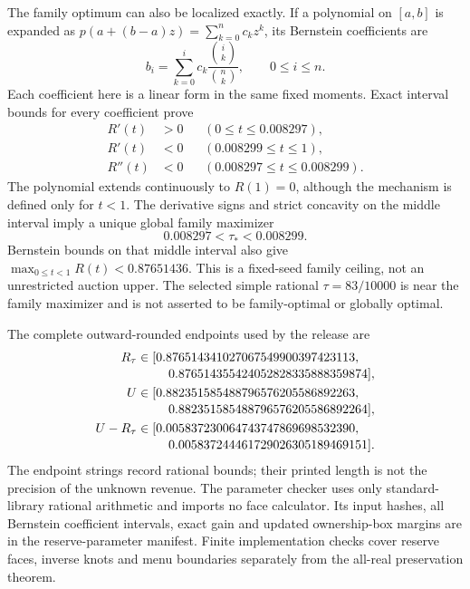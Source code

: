 The family optimum can also be localized exactly. If a polynomial on
$[a,b]$ is expanded as $p(a+(b-a)z)=\sum_{k=0}^n c_kz^k$, its Bernstein
coefficients are
\[
 b_i=\sum_{k=0}^i c_k\frac{\binom{i}{k}}{\binom{n}{k}},
 \qquad 0\le i\le n.
\]
Each coefficient here is a linear form in the same fixed moments. Exact
interval bounds for every coefficient prove
\[
\begin{aligned}
 R'(t)&>0 &&(0\le t\le0.008297),\\
 R'(t)&<0 &&(0.008299\le t\le1),\\
 R''(t)&<0 &&(0.008297\le t\le0.008299).
\end{aligned}
\]
The polynomial extends continuously to $R(1)=0$, although the mechanism
is defined only for $t<1$. The derivative signs and strict concavity on
the middle interval imply a unique global family maximizer
\[
 0.008297<\tau_*<0.008299.
\]
Bernstein bounds on that middle interval also give
$\max_{0\le t<1}R(t)<0.87651436$. This is a fixed-seed family ceiling,
not an unrestricted auction upper. The selected simple rational
$\tau=83/10000$ is near the family maximizer and is not asserted to be
family-optimal or globally optimal.

The complete outward-rounded endpoints used by the release are
\[
\begin{aligned}
 R_\tau&\in[0.876514341027067549900397423113,\\[-2pt]
       &\hspace{2.5em}0.876514355424052828335888359874],\\
 U&\in[0.882351585488796576205586892263,\\[-2pt]
       &\hspace{2.5em}0.882351585488796576205586892264],\\
 U-R_\tau&\in[0.005837230064743747869698532390,\\[-2pt]
       &\hspace{2.5em}0.005837244461729026305189469151].
\end{aligned}
\]
The endpoint strings record rational bounds; their printed length is not
the precision of the unknown revenue. The parameter checker uses only
standard-library rational arithmetic and imports no face calculator.
Its input hashes, all Bernstein coefficient intervals, exact gain and
updated ownership-box margins are in the reserve-parameter manifest.
Finite implementation checks cover reserve faces, inverse knots and menu
boundaries separately from the all-real preservation theorem.
